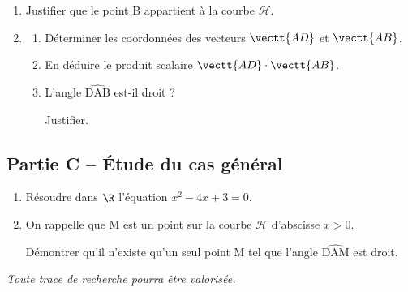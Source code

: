 	\begin{enumerate}
		\item Justifier que le point B appartient à la courbe $\mathcal{H}$.
		\item \begin{enumerate}
			\item Déterminer les coordonnées des vecteurs $\vectt{AD}$ et $\vectt{AB}$.

			\item En déduire le produit scalaire $\vectt{AD}\cdot\vectt{AB}$.

			\item L'angle $\widehat{\mathrm{DAB}}$ est-il droit ?

			Justifier.
		\end{enumerate}
	\end{enumerate}

	\subsection*{Partie C -- Étude du cas général}

	\begin{enumerate}
		\item Résoudre dans $\R$ l'équation \quad $x^2 - 4x + 3 = 0$.
		\item On rappelle que M est un point sur la courbe $\mathcal{H}$ d'abscisse $x>0$.

		Démontrer qu'il n'existe qu'un seul point M tel que l'angle $\widehat{\mathrm{DAM}}$ est droit.
	\end{enumerate}

	\vspace{1em}
	\emph{Toute trace de recherche pourra être valorisée.}
